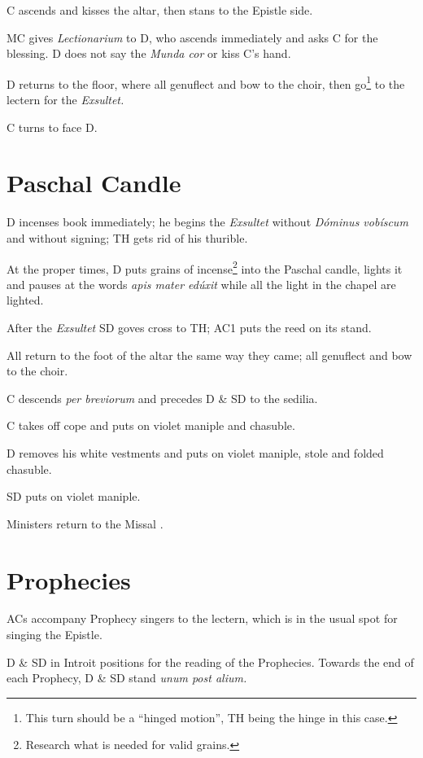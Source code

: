 {\rubric C ascends and kisses the altar, then stans to the Epistle side.

\rubric MC gives \textit{Lectionarium} to D, who ascends immediately and asks C
for the blessing. D does not say the \textit{Munda cor} or kiss C's hand.

\rubric D returns to the floor, where all genuflect and bow to the choir, then
go\footnote{This turn should be a ``hinged motion'', TH being the hinge in this
case.} to the lectern for the \textit{Exsultet.}

\rubric C turns to face D.

\section{Paschal Candle}

\rubric D incenses book immediately; he begins the \textit{Exsultet} without
\textit{Dóminus vobíscum} and without signing; TH gets rid of his thurible.

\rubric At the proper times, D puts grains of incense\footnote{Research what is
needed for valid grains.} into the Paschal candle, lights it and pauses at the
words \textit{apis mater edúxit} while all the light in the chapel are lighted.

\rubric After the \textit{Exsultet} SD goves cross to TH; AC1 puts the reed on
its stand.

\rubric All return to the foot of the altar the same way they came; all
genuflect and bow to the choir.

\rubric C descends \textit{per breviorum} and precedes D \& SD to the sedilia.

\rubric C takes off cope and puts on violet maniple and chasuble.

\rubric D removes his white vestments and puts on violet maniple, stole and
folded chasuble.

\rubric SD puts on violet maniple.

\rubric Ministers return to the Missal \pbr.

\section{Prophecies}

\rubric ACs accompany Prophecy singers to the lectern, which is in the usual
spot for singing the Epistle.

\rubric D \& SD in Introit positions for the reading of the Prophecies. Towards
the end of each Prophecy, D \& SD stand \textit{unum post alium.}

}
